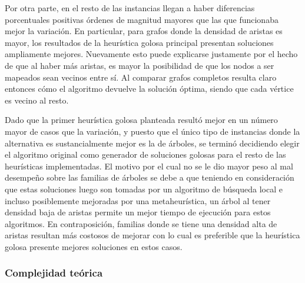 Por otra parte, en el resto de las instancias llegan a haber diferencias
porcentuales positivas órdenes de magnitud mayores que las que funcionaba mejor
la variación. En particular, para grafos donde la densidad de aristas es mayor,
los resultados de la heurística golosa principal presentan soluciones
ampliamente mejores. Nuevamente esto puede explicarse justamente por el hecho de
que al haber más aristas, es mayor la posibilidad de que los nodos a ser
mapeados sean vecinos entre sí. Al comparar grafos completos resulta claro
entonces cómo el algoritmo devuelve la solución óptima, siendo que cada vértice
es vecino al resto.

Dado que la primer heurística golosa planteada resultó mejor en un número mayor
de casos que la variación, y puesto que el único tipo de instancias donde la
alternativa es sustancialmente mejor es la de árboles, se terminó decidiendo
elegir el algoritmo original como generador de soluciones golosas para el resto
de las heurísticas implementadas. El motivo por el cual no se le dio mayor peso
al mal desempeño  sobre las familias de árboles se debe a que teniendo en
consideración que estas soluciones luego son tomadas por un algoritmo de
búsqueda local e incluso posiblemente mejoradas por una metaheurística, un árbol
al tener densidad baja de aristas permite un mejor tiempo de ejecución para
estos algoritmos. En contraposición, familias donde se tiene una densidad alta
de aristas resultan más costosos de mejorar con lo cual es preferible que la
heurística golosa presente mejores soluciones en estos casos.

\subsubsection{Complejidad teórica}
